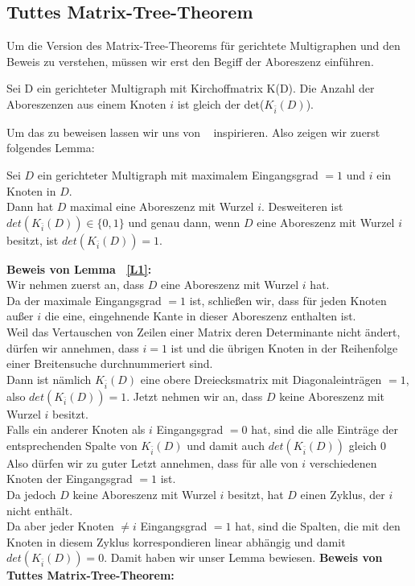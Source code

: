 \subsection{Tuttes Matrix-Tree-Theorem}
Um die Version des Matrix-Tree-Theorems für gerichtete Multigraphen und den Beweis zu verstehen, müssen wir erst den Begiff der Aboreszenz einführen.
\begin{Tms}
Sei D ein gerichteter Multigraph mit Kirchoffmatrix K(D). Die Anzahl der Aboreszenzen aus einem Knoten $i$ ist gleich der det($K_{\bar{i}}(D)$).
\end{Tms}
Um das zu beweisen lassen wir uns von ~\cite{bang-jensen_2009} inspirieren.
Also zeigen wir zuerst folgendes Lemma:
\begin{Lms}
Sei $D$ ein gerichteter Multigraph mit maximalem Eingangsgrad $=1$ und $i$ ein Knoten in $D$.\\
Dann hat $D$ maximal eine Aboreszenz mit Wurzel $i$. Desweiteren ist $det(K_{\bar{i}}(D)) \in \{0,1\}$
und genau dann, wenn $D$ eine Aboreszenz mit Wurzel $i$ besitzt, ist $det(K_{\bar{i}}(D)) = 1$.
\label{L1}
\end{Lms}
\textbf{Beweis von Lemma ~\ref{L1}:}\\
Wir nehmen zuerst an, dass $D$ eine Aboreszenz mit Wurzel $i$ hat.\\
Da der maximale Eingangsgrad $=1$ ist, schließen wir, dass für jeden Knoten außer $i$ die eine, eingehnende Kante in dieser Aboreszenz enthalten ist. \\
Weil das Vertauschen von Zeilen einer Matrix deren Determinante nicht ändert, dürfen wir annehmen, dass $i=1$ ist und die übrigen Knoten in der Reihenfolge einer Breitensuche durchnummeriert sind.\\ 
Dann ist nämlich $K_{\bar{i}}(D)$ eine obere Dreiecksmatrix mit Diagonaleinträgen $=1$, also $det(K_{\bar{i}}(D)) = 1$.
Jetzt nehmen wir an, dass $D$ keine Aboreszenz mit Wurzel $i$ besitzt.\\
Falls ein anderer Knoten als $i$ Eingangsgrad $=0$ hat, sind die alle Einträge der entsprechenden Spalte von $K_{\bar{i}}(D)$ und damit auch $det(K_{\bar{i}}(D))$ gleich $0$\\
Also dürfen wir zu guter Letzt annehmen, dass für alle von $i$ verschiedenen Knoten der Eingangsgrad $=1$ ist.\\
Da jedoch $D$ keine Aboreszenz mit Wurzel $i$ besitzt, hat $D$ einen Zyklus, der $i$ nicht enthält.\\
Da aber jeder Knoten $\neq i$ Eingangsgrad $=1$ hat, sind die Spalten, die mit den Knoten in diesem Zyklus korrespondieren linear abhängig und damit $det(K_{\bar{i}}(D)) = 0$.
Damit haben wir unser Lemma bewiesen.
\textbf{Beweis von Tuttes Matrix-Tree-Theorem:}
